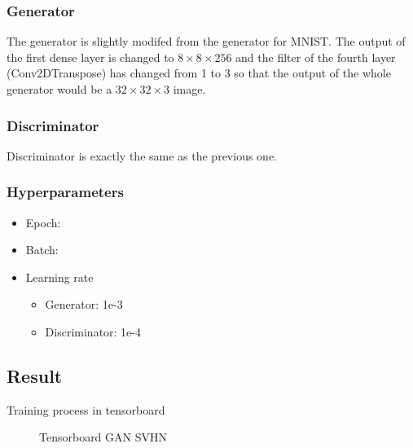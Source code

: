 \documentclass{article}
\begin{document}
\subsubsection{Generator}

The generator is slightly modifed from the generator for MNIST. 
The output of the first dense layer is changed to $8\times 8\times 256$ 
and the filter of the fourth layer (Conv2DTranspose) has changed from 1 to 3
so that the output of the whole generator would be a $32\times 32\times 3$ image.

\subsubsection{Discriminator}

Discriminator is exactly the same as the previous one.

\subsubsection{Hyperparameters}

\begin{itemize}
  \item Epoch: 
  \item Batch: 
  \item Learning rate
    \begin{itemize}
      \item Generator: 1e-3
      \item Discriminator: 1e-4
    \end{itemize}
\end{itemize}

\subsection{Result}

Training process in tensorboard

\begin{figure}[!htb]
  \centering
  \caption{Tensorboard GAN SVHN}
  \label{fig:TB_GAN_SVHN}
\end{figure}
\end{document}
